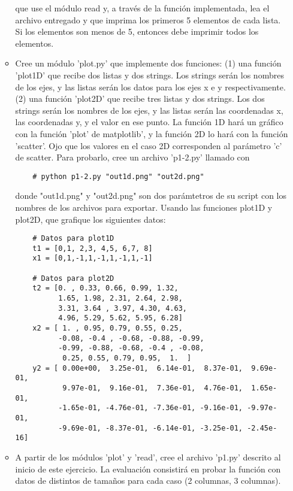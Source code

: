 \documentclass{article}
\begin{document}
\begin{itemize}
\begin{itemize}
        que use el módulo read y, a través de la función implementada, lea el archivo entregado y que imprima los primeros 5 elementos de cada lista. Si los elementos son menos de 5, entonces debe imprimir todos los elementos.

        \item Cree un módulo 'plot.py' que implemente dos funciones: (1) una función 'plot1D' que recibe dos listas y dos strings. Los strings serán los nombres de los ejes, y las listas serán los datos para los ejes x e y respectivamente. (2) una función 'plot2D' que recibe tres listas y dos strings. Los dos strings serán los nombres de los ejes, y las listas serán las coordenadas x, las coordenadas y, y el valor en ese punto. La función 1D hará un gráfico con la función 'plot' de matplotlib', y la función 2D lo hará con la función 'scatter'. Ojo que los valores en el caso 2D corresponden al parámetro 'c' de scatter. Para probarlo, cree un archivo 'p1-2.py' llamado con

    \begin{verbatim}
    # python p1-2.py "out1d.png" "out2d.png"
    \end{verbatim}
 
        donde "out1d.png" y "out2d.png" son dos parámtetros de su script con los nombres de los archivos para exportar. Usando las funciones plot1D y plot2D, que grafique los siguientes datos: 

    \begin{verbatim}
    # Datos para plot1D
    t1 = [0,1, 2,3, 4,5, 6,7, 8]
    x1 = [0,1,-1,1,-1,1,-1,1,-1]

    # Datos para plot2D
    t2 = [0. , 0.33, 0.66, 0.99, 1.32, 
          1.65, 1.98, 2.31, 2.64, 2.98, 
          3.31, 3.64 , 3.97, 4.30, 4.63, 
          4.96, 5.29, 5.62, 5.95, 6.28]
    x2 = [ 1. , 0.95, 0.79, 0.55, 0.25, 
          -0.08, -0.4 , -0.68, -0.88, -0.99, 
          -0.99, -0.88, -0.68, -0.4 , -0.08, 
           0.25, 0.55, 0.79, 0.95,  1.  ]
    y2 = [ 0.00e+00,  3.25e-01,  6.14e-01,  8.37e-01,  9.69e-01, 
           9.97e-01,  9.16e-01,  7.36e-01,  4.76e-01,  1.65e-01, 
          -1.65e-01, -4.76e-01, -7.36e-01, -9.16e-01, -9.97e-01, 
          -9.69e-01, -8.37e-01, -6.14e-01, -3.25e-01, -2.45e-16]
    \end{verbatim}

        \item A partir de los módulos 'plot' y 'read', cree el archivo 'p1.py' descrito al inicio de este ejercicio. La evaluación consistirá en probar la función con datos de distintos de tamaños para cada caso (2 columnas, 3 columnas).


\end{itemize}
\end{itemize}
\end{document}
